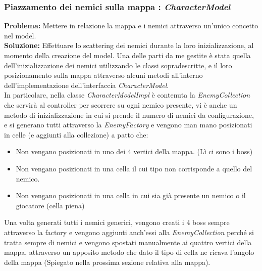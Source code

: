 \documentclass[a4paper,12pt]{report}
\begin{document}
\subsubsection{Piazzamento dei nemici sulla mappa : \textit{CharacterModel}}
\textbf{Problema:} Mettere in relazione la mappa e i nemici attraverso un'unico concetto nel model.\\
\textbf{Soluzione:} Effettuare lo scattering dei nemici durante la loro inizializzazione, al momento della creazione del model.
Una delle parti da me gestite è stata quella dell'inizializzazione dei nemici utilizzando le classi sopradescritte, e il loro posizionamento sulla mappa attraverso alcuni metodi all'interno dell'implementazione dell'interfaccia \textit{CharacterModel}.\\
In particolare, nella classe \textit{CharacterModelImpl} è contenuta la \textit{EnemyCollection} che servirà al controller per scorrere su ogni nemico presente, vi è anche un metodo di inizializzazione in cui si prende il numero di nemici da configurazione, e si generano tutti attraverso la \textit{EnemyFactory} e vengono man mano posizionati in celle (e aggiunti alla collezione) a patto che:
\begin{itemize}
	\item Non vengano posizionati in uno dei 4 vertici della mappa. (Lì ci sono i boss)
	\item Non vengano posizionati in una cella il cui tipo non corrisponde a quello del nemico.
	\item Non vengano posizionati in una cella in cui sia già presente un nemico o il giocatore (cella piena)
\end{itemize}
Una volta generati tutti i nemici generici, vengono creati i 4 boss sempre attraverso la factory e vengono aggiunti anch'essi alla \textit{EnemyCollection} perché si tratta sempre di nemici e vengono spostati manualmente ai quattro vertici della mappa, attraverso un apposito metodo che dato il tipo di cella ne ricava l'angolo della mappa (Spiegato nella prossima sezione relativa alla mappa).
\end{document}
